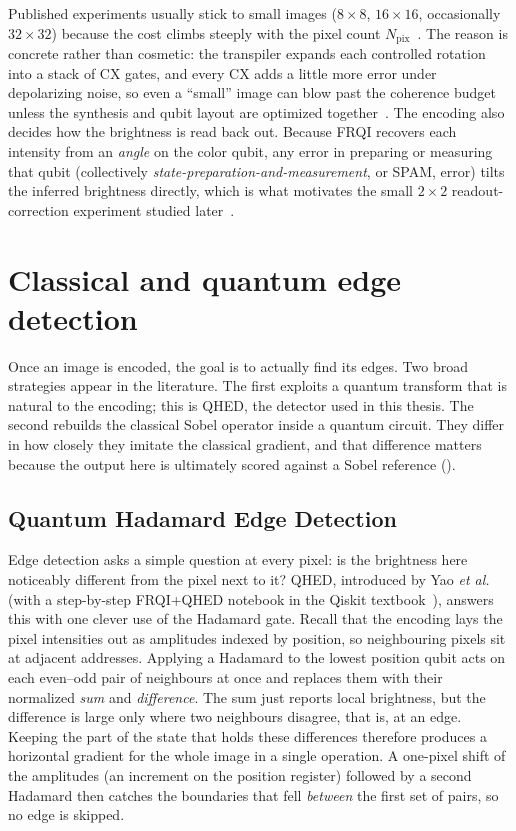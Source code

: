 Published experiments usually stick to small images ($8\times 8$, $16\times 16$, occasionally $32\times 32$) because the cost climbs steeply with the pixel count $N_{\mathrm{pix}}$~\cite{Farooq2025SystematicReview}. The reason is concrete rather than cosmetic: the transpiler expands each controlled rotation into a stack of CX gates, and every CX adds a little more error under depolarizing noise, so even a ``small'' image can blow past the coherence budget unless the synthesis and qubit layout are optimized together~\cite{Geng2023ImprovedFRQI}. The encoding also decides how the brightness is read back out. Because FRQI recovers each intensity from an \emph{angle} on the color qubit, any error in preparing or measuring that qubit (collectively \emph{state-preparation-and-measurement}, or SPAM, error) tilts the inferred brightness directly, which is what motivates the small $2\times 2$ readout-correction experiment studied later~\cite{Mu2025GuidedImageFiltering}.

\section{Classical and quantum edge detection}
Once an image is encoded, the goal is to actually find its edges. Two broad strategies appear in the literature. The first exploits a quantum transform that is natural to the encoding; this is QHED, the detector used in this thesis. The second rebuilds the classical Sobel operator inside a quantum circuit. They differ in how closely they imitate the classical gradient, and that difference matters because the output here is ultimately scored against a Sobel reference ().

\subsection{Quantum Hadamard Edge Detection}
Edge detection asks a simple question at every pixel: is the brightness here noticeably different from the pixel next to it? QHED, introduced by Yao \textit{et al.}~\cite{Yao2017QHED} (with a step-by-step FRQI+QHED notebook in the Qiskit textbook~\cite{QiskitTextbookQuantumEdgeDetection}), answers this with one clever use of the Hadamard gate. Recall that the encoding lays the pixel intensities out as amplitudes indexed by position, so neighbouring pixels sit at adjacent addresses. Applying a Hadamard to the lowest position qubit acts on each even--odd pair of neighbours at once and replaces them with their normalized \emph{sum} and \emph{difference}. The sum just reports local brightness, but the difference is large only where two neighbours disagree, that is, at an edge. Keeping the part of the state that holds these differences therefore produces a horizontal gradient for the whole image in a single operation. A one-pixel shift of the amplitudes (an increment on the position register) followed by a second Hadamard then catches the boundaries that fell \emph{between} the first set of pairs, so no edge is skipped.

